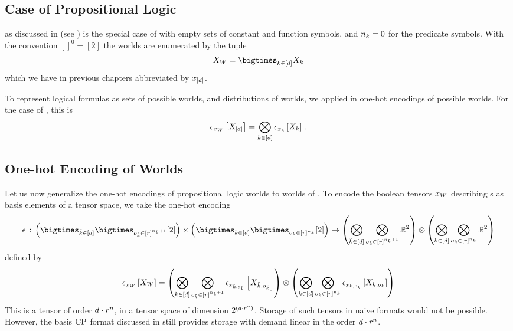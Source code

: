 \subsection{Case of Propositional Logic}

\PropositionalLogic{} as discussed in (see ) is the special case of \firstOrderLogic{} with empty sets of constant and function symbols, and $n_{k}=0$ for the predicate symbols.
With the convention $[]^{0}=[2]$ the worlds are enumerated by the tuple
\begin{align*}
    \worldvariables = \bigtimes_{\atomenumeratorin} \catvariableof{\atomenumerator}
\end{align*}
which we have in previous chapters abbreviated by $x_{[d]}$.


To represent logical formulas as sets of possible worlds, and distributions of worlds, we applied in  one-hot encodings of possible worlds.
For the case of \propositionalLogic{}, this is
\begin{align*}
    \epsilon_{x_{W}}\left[X_{[d]}\right]
    = \bigotimes_{k\in[d]} \epsilon_{x_{k}}\left[X_{k}\right] \, .
\end{align*}

\subsection{One-hot Encoding of Worlds}

Let us now generalize the one-hot encodings of propositional logic worlds to worlds of \firstOrderLogic{}.
To encode the boolean tensors $x_{W}$ describing \firstOrderLogic{}s as basis elements of a tensor space, we take the one-hot encoding
\begin{align*}
    \onehotmap \defcols \worldindexset \rightarrow \worldtensorspace
\end{align*}
defined by
\begin{align*}
    \epsilon_{x_{W}}\left[X_{W}\right]
    =
    \left(\bigotimes_{\tilde{k}\in[d]}\bigotimes_{o_{\tilde{k}}\in[r]^{n_{\tilde{k}}+1}}
        \epsilon_{x_{\tilde{k},o_{\tilde{k}}}}\left[X_{\tilde{k},o_{\tilde{k}}}\right]\right)
    \otimes\left(\bigotimes_{k\in[d]}\bigotimes_{o_{k}\in[r]^{n_{k}}}
        \epsilon_{x_{k,o_{k}}}\left[X_{k,o_{k}}\right] \right)
\end{align*}
This is a tensor of order $d\cdot r^{n}$, in a tensor space of dimension $2^{\left(d\cdot r^{n}\right)}$.
Storage of such tensors in naive formats would not be possible.
However, the basis $\mathrm{CP}$ format discussed in  still provides storage with demand linear in the order $d\cdot r^{n}$.
